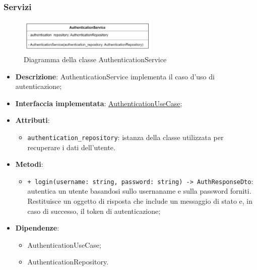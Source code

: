 \subsubsection{Servizi}

 \label{AuthenticationService}
\begin{figure}[H]
    \centering
    \includegraphics[width=0.6\textwidth]{assets/Backend/authentication_service.png}
    \caption{Diagramma della classe AuthenticationService}
  \end{figure}
\begin{itemize}
    \item \textbf{Descrizione}: AuthenticationService implementa il caso d'uso di autenticazione;
    \item \textbf{Interfaccia implementata}: \hyperref[AuthenticationUseCase]{AuthenticationUseCase};
    \item \textbf{Attributi}:
    \begin{itemize}
        \item \texttt{authentication\_repository}: istanza della classe utilizzata per recuperare i dati dell'utente.
    \end{itemize}
    \item \textbf{Metodi}: 
    \begin{itemize}
        \item \texttt{+ login(username: string, password: string) -> AuthResponseDto}: autentica un utente basandosi sullo usernaname e sulla password forniti. Restituisce un oggetto di risposta che include un messaggio di stato e, in caso di successo, il token di autenticazione;
    \end{itemize}
    \item \textbf{Dipendenze}:
    \begin{itemize}
        \item AuthenticationUseCase;
        \item AuthenticationRepository.
    \end{itemize}
\end{itemize}  

